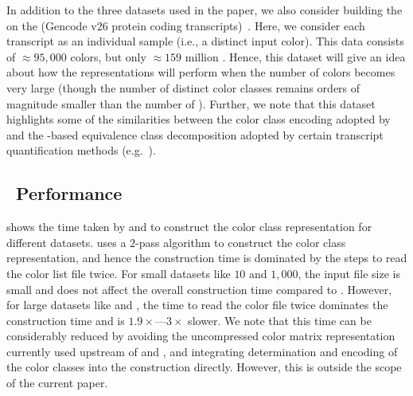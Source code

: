 In addition to the three datasets used in the \vari paper, we also consider
building the \cdbg on the 
(Gencode v26 protein coding transcripts)~\cite{Harrow2012}. Here, we consider
each transcript as an individual sample (i.e., a distinct input color). This
data consists of $\approx95,000$ colors, but only $\approx159$ million \kmers.
Hence, this dataset will give an idea about how the representations
will perform when the number of colors becomes very large (though the number of
distinct color classes remains orders of magnitude smaller than the number of
\kmers). Further, we note that this dataset highlights some of the similarities
between the color class encoding adopted by \rainbowfish and the \kmer-based
equivalence class decomposition adopted by certain transcript quantification
methods (e.g.~\cite{PatroSailfish:2014}).



\subsection{~Performance}

 shows the time taken by \rainbowfish and \vari to construct the color
class representation for different datasets. \rainbowfish uses a $2$-pass algorithm
to construct the color class representation, and hence the construction time is
dominated by the steps to read the color list file twice. For small datasets
like \ecoli $10$ and \ecoli $1,000$, the input file size is small and does not affect
the overall construction time compared to \vari. However, for large datasets
like \plant and \beefsafety, the time to read the color file twice dominates the
construction time and \rainbowfish is $1.9\times$---$3\times$ slower. We note that
this time can be considerably reduced by avoiding the uncompressed color matrix
representation currently used upstream of \rainbowfish and \vari, and integrating
determination and encoding of the color classes into the \dbg construction
directly. However, this is outside the scope of the current paper.

